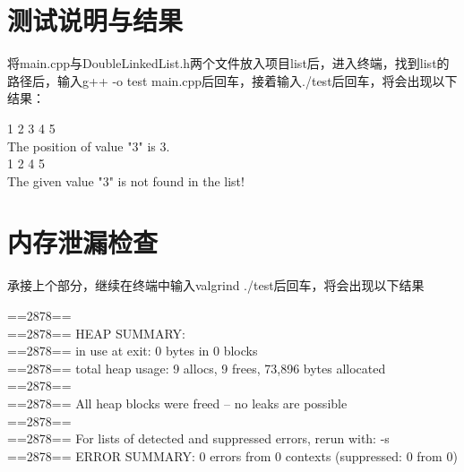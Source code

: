 \documentclass[UTF8]{ctexart}
\begin{document}
\section{测试说明与结果}

将main.cpp与DoubleLinkedList.h两个文件放入项目list后，进入终端，找到list的路径后，输入g++ -o test main.cpp后回车，接着输入./test后回车，将会出现以下结果：

\begin{flushleft}
1 2 3 4 5 \\
The position of value "3" is 3. \\
1 2 4 5 \\
The given value "3" is not found in the list! \\
\end{flushleft}

\section{内存泄漏检查}

承接上个部分，继续在终端中输入valgrind ./test后回车，将会出现以下结果

\begin{flushleft}
==2878== \\
==2878== HEAP SUMMARY: \\
==2878==     in use at exit: 0 bytes in 0 blocks \\
==2878==   total heap usage: 9 allocs, 9 frees, 73,896 bytes allocated \\
==2878== \\
==2878== All heap blocks were freed -- no leaks are possible \\
==2878== \\
==2878== For lists of detected and suppressed errors, rerun with: -s \\
==2878== ERROR SUMMARY: 0 errors from 0 contexts (suppressed: 0 from 0) \\
\end{flushleft}
\end{document}
